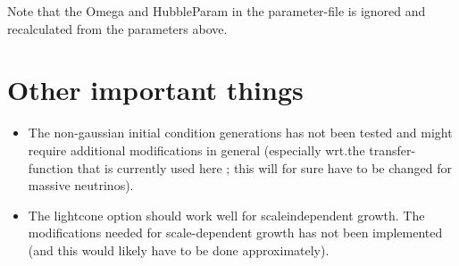 \documentclass[usenatbib]{article}
\begin{document}
Note that the Omega and HubbleParam in the parameter-file is ignored and recalculated from the parameters above.

\section*{Other important things}

\begin{itemize}
\item The non-gaussian initial condition generations has not been tested and might require additional modifications in general (especially wrt.the transfer-function that is currently used here ; this will for sure have to be changed for massive neutrinos).
\item The lightcone option should work well for scaleindependent growth. The modifications needed for scale-dependent growth has not been implemented (and this would likely have to be done approximately).
\end{itemize}
\end{document}
